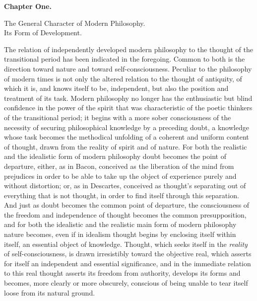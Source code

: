 \begin{center}
  \textbf{Chapter One.}
\end{center}

\begin{center}
  {\large The General Character of Modern Philosophy.\\
  Its Form of Development.}
\end{center}

\divrule

The relation of independently developed modern philosophy to the thought
of the transitional period has been indicated in the foregoing. Common
to both is the direction toward nature and toward self-consciousness.
Peculiar to the philosophy of modern times is not only the altered
relation to the thought of antiquity, of which it is, and knows itself
to be, independent, but also the position and treatment of its task.
Modern philosophy no longer has the enthusiastic but blind confidence in
the power of the spirit that was characteristic of the poetic thinkers
of the transitional period; it begins with a more sober consciousness of
the necessity of securing philosophical knowledge by a preceding doubt,
a knowledge whose task becomes the methodical unfolding of a coherent
and uniform content of thought, drawn from the reality of spirit and of
nature. For both the realistic and the idealistic form of modern
philosophy doubt becomes the point of departure, either, as in Bacon,
conceived as the liberation of the mind from prejudices in order to be
able to take up the object of experience purely and without distortion;
or, as in Descartes, conceived as thought's separating out of everything
that is not thought, in order to find itself through this separation.
And just as doubt becomes the common point of departure, the
consciousness of the freedom and independence of thought becomes the
common presupposition, and for both the idealistic and the
realistic main form of modern philosophy nature becomes, even if in
idealism thought begins by enclosing itself within itself, an essential
object of knowledge. Thought, which seeks itself in the \emph{reality}
of self-consciousness, is drawn irresistibly toward the objective real,
which asserts for itself an independent and essential significance, and
in the immediate relation to this real thought asserts its freedom from
authority, develops its forms and becomes, more clearly or more
obscurely, conscious of being unable to tear itself loose from its
natural ground.

